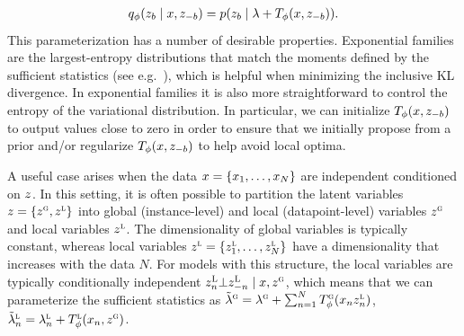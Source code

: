 \documentclass{article}
\theoremstyle{definition}
\begin{document}
\begin{align*}
    q_\phi(z_b \mid x, z_{-b}) 
    = 
    p(z_b \mid \lambda + T_\phi(x, z_{-b}))
    .
\end{align*}
This parameterization has a number of desirable properties. Exponential families are the largest-entropy distributions that match the moments defined by the sufficient statistics (see e.g.~\citet{wainwright2008graphical}), which is helpful when minimizing the inclusive KL divergence. In exponential families it is also more straightforward to control the entropy of the variational distribution. In particular, we can initialize $T_\phi(x, z_{-b})$ to output values close to zero in order to ensure that we initially propose from a prior and/or regularize $T_\phi(x, z_{-b})$ to help avoid local optima.

A useful case arises when the data $x = \{x_1, \ldots, x_N\}$ are independent conditioned on $z$. In this setting, it is often possible to partition the latent variables $z = \{z^\textsc{g}, z^\textsc{l}\}$ into global (instance-level) and local (datapoint-level) variables $z^{\textsc{g}}$ and local variables $z^{\textsc{l}}$. The dimensionality of global variables is typically constant, whereas local variables $z^\textsc{l} = \{z^\textsc{l}_1, \ldots, z^\textsc{l}_N\}$ have a dimensionality that increases with the data $N$. For models with this structure, the local variables are typically conditionally independent $z^\textsc{L}_n \bot z^\textsc{L}_{-n} \mid x, z^\textsc{g}$, which means that we can parameterize the sufficient statistics as $\tilde{\lambda}^\textsc{g}=\lambda^\textsc{g} + 
    \sum_{n=1}^N T^\textsc{g}_\phi(x_n z^\textsc{l}_{n})$, $\tilde{\lambda}^\textsc{l}_n=\lambda^\textsc{l}_n + T^\textsc{l}_\phi(x_n, z^\textsc{g})$.
\end{document}
